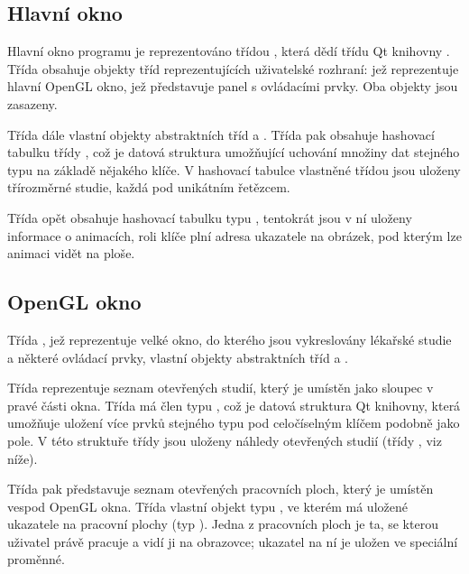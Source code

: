 \subsection*{Hlavní okno}

Hlavní okno programu je reprezentováno třídou , která dědí třídu Qt knihovny . Třída  obsahuje objekty tříd reprezentujících uživatelské rozhraní:  jež reprezentuje hlavní OpenGL okno,  jež představuje panel s ovládacími prvky. Oba objekty jsou zasazeny.

Třída   dále vlastní objekty abstraktních tříd  a . Třída  pak obsahuje hashovací tabulku třídy , což je datová struktura umožňující uchování množiny dat stejného typu na základě nějakého klíče. V hashovací tabulce vlastněné třídou  jsou uloženy třírozměrné studie, každá pod unikátním řetězcem. 

Třída  opět obsahuje hashovací tabulku typu , tentokrát jsou v ní uloženy informace o animacích, roli klíče plní adresa ukazatele na obrázek, pod kterým lze animaci vidět na ploše.

\subsection*{OpenGL okno}
Třída , jež reprezentuje velké okno, do kterého jsou vykreslovány lékařské studie a některé ovládací prvky, vlastní objekty abstraktních tříd  a .

Třída  reprezentuje seznam otevřených studií, který je umístěn jako sloupec v pravé části okna. Třída má člen typu , což je datová struktura Qt knihovny, která umožňuje uložení více prvků stejného typu pod celočíselným klíčem podobně jako pole. V této struktuře třídy  jsou uloženy náhledy otevřených studií (třídy , viz níže).

Třída  pak představuje seznam otevřených pracovních ploch, který je umístěn vespod OpenGL okna. Třída vlastní objekt typu , ve kterém má uložené ukazatele na pracovní plochy (typ ). Jedna z pracovních ploch je ta, se kterou uživatel právě pracuje a vidí ji na obrazovce; ukazatel na ní je uložen ve speciální proměnné.  

